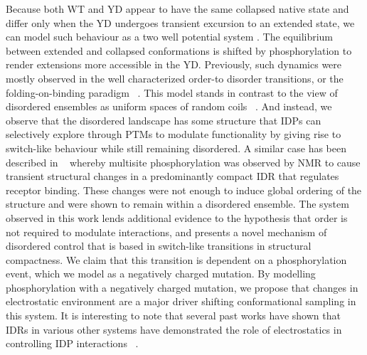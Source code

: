  Because both WT and YD appear to have the same collapsed native state and differ only when the YD undergoes transient excursion to an extended state, we can model such behaviour as a two well potential system . The equilibrium between extended and collapsed conformations is shifted by phosphorylation to render extensions more accessible in the YD.  Previously, such dynamics were mostly observed in the well characterized order-to disorder transitions, or the folding-on-binding paradigm ~\cite{tompa2012intrinsically}. This model stands in contrast to the view of disordered ensembles as uniform  spaces of random coils ~\cite{mittag2007atomic}. And instead, we observe that the disordered landscape has some structure that IDPs can selectively explore  through PTMs to modulate functionality by giving rise to switch-like behaviour while still remaining disordered. A similar case has been described in ~\cite{mittag2008dynamic} whereby multisite phosphorylation was observed by NMR to cause transient structural changes in a predominantly compact IDR that regulates receptor binding. These changes were not enough to induce global ordering of the structure and were shown to remain within a disordered ensemble. The system observed in this work lends additional evidence to the hypothesis that order is not required to modulate interactions, and presents a novel mechanism of disordered control that is based in switch-like transitions in structural compactness. We claim that this transition is dependent on a phosphorylation event, which we model as a negatively charged mutation. By modelling phosphorylation with a negatively charged mutation, we propose that changes in electrostatic environment are a major driver shifting conformational sampling in this system. It is interesting to note that several past works have shown that IDRs in various other systems have demonstrated the role of electrostatics in controlling IDP interactions ~\cite{borg2007polyelectrostatic,chen2015theoretical,mao2010net}. 
 
\begin{figure}
\centering     %
{}
\label{fig:wells}
\end{figure}

